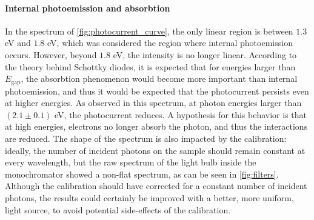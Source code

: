 \paragraph{Internal photoemission and absorbtion}
In the spectrum of \autoref{fig:photocurrent_curve}, the only linear region is between $1.3$ eV and $1.8$ eV, which was considered the region where internal photoemission occurs. However, beyond $1.8$ eV, the intensity is no longer linear. According to the theory behind Schottky diodes, it is expected that for energies larger than $E_\textrm{gap}$, the absorbtion phenomenon would become more important than internal photoemission, and thus it would be expected that the photocurrent persists even at higher energies. As observed in this spectrum, at photon energies larger than $(2.1 \pm 0.1)$ eV, the photocurrent reduces. A hypothesis for this behavior is that at high energies, electrons no longer absorb the photon, and thus the interactions are reduced.
The shape of the spectrum is also impacted by the calibration: ideally, the number of incident photons on the sample should remain constant at every wavelength, but the raw spectrum of the light bulb inside the monochromator showed a non-flat spectrum, as can be seen in \autoref{fig:filters}. Although the calibration should have corrected for a constant number of incident photons, the results could certainly be improved with a better, more uniform, light source, to avoid potential side-effects of the calibration.